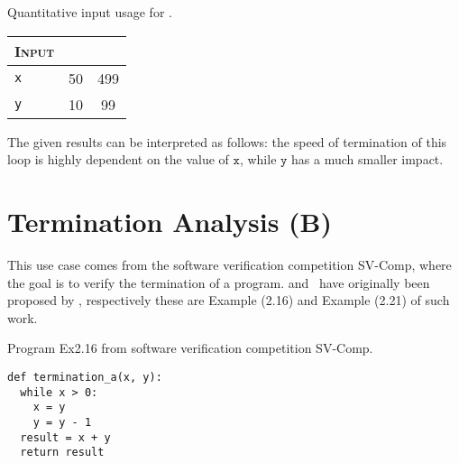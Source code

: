 \begin{margintable}
  \caption{Quantitative input usage for .}
  \centering
  \begin{tabular}{l | c c}
    \textsc{Input} & \textsc{\abstractoutcomesname{}} & \textsc{\abstractrangename{}} \\
    \toprule
    \texttt{x} & 50 & 499 \\
    \texttt{y} & 10 & 99 \\
    \bottomrule
  \end{tabular}
\end{margintable}

The given results can be interpreted as follows: the speed of termination of this loop is highly dependent on the value of $\texttt{x}$, while $\texttt{y}$ has a much smaller impact.



\section{Termination Analysis (B)}

This use case comes from the software verification competition SV-Comp, where the goal is to verify the termination of a program.  and~ have originally been proposed by , respectively these are Example (2.16) and Example (2.21) of such work.

\begin{marginlisting}
  \caption{Program Ex2.16 from software verification competition SV-Comp.}
  \vspace{15pt}
\begin{lstlisting}[style=mystyle,
  language=customPython,
  escapechar=\%,
]
def termination_a(x, y):
  while x > 0:
    x = y
    y = y - 1
  result = x + y
  return result
\end{lstlisting}
\end{marginlisting}


